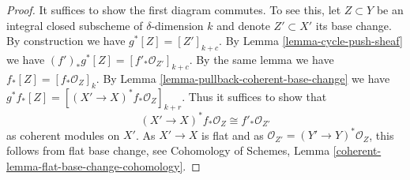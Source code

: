 \documentclass[10pt,a4paper]{amsart}
\theoremstyle{plain}
\theoremstyle{definition}
\theoremstyle{remark}
\numberwithin{equation}{subsection}
\begin{document}
\begin{proof}
It suffices to show the first diagram commutes. To see this, let
$Z \subset Y$ be an integral closed subscheme of $\delta$-dimension $k$
and denote $Z' \subset X'$ its base change. By construction
we have $g^*[Z] = [Z']_{k + c}$. By Lemma \ref{lemma-cycle-push-sheaf}
we have $(f')_*g^*[Z] = [f'_*\mathcal{O}_{Z'}]_{k + c}$.
By the same lemma we have $f_*[Z] = [f_*\mathcal{O}_Z]_k$. By
Lemma \ref{lemma-pullback-coherent-base-change}
we have $g^*f_*[Z] = [(X' \to X)^*f_*\mathcal{O}_Z]_{k + r}$.
Thus it suffices to show that
$$
(X' \to X)^*f_*\mathcal{O}_Z \cong f'_*\mathcal{O}_{Z'}
$$
as coherent modules on $X'$. As $X' \to X$ is flat and as
$\mathcal{O}_{Z'} = (Y' \to Y)^*\mathcal{O}_Z$, this
follows from flat base change, see
Cohomology of Schemes, Lemma \ref{coherent-lemma-flat-base-change-cohomology}.
\end{proof}
\end{document}
